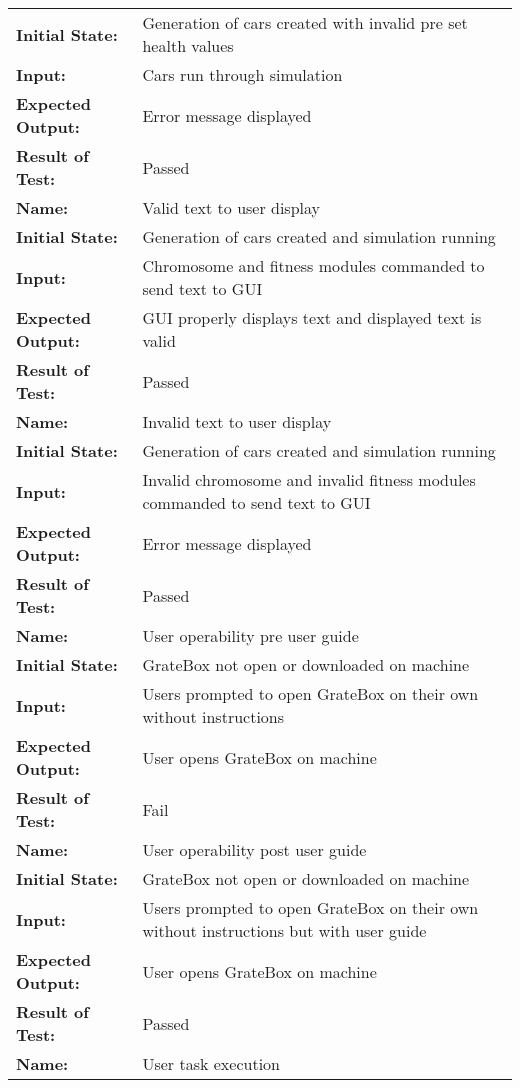 \documentclass[12pt, titlepage]{article}
\begin{document}
\begin{center}
\begin{longtable}{ l | p{10cm} }
\textbf{Initial State:} & Generation of cars created with invalid pre set health 
values\\
\textbf{Input:} & Cars run through simulation\\
\textbf{Expected Output:} & Error message displayed\\[0.6em]
\textbf{Result of Test:} & Passed\\
\hline
\rule{0pt}{1.5em}\textbf{Name:} & Valid text to user display\\
\textbf{Initial State:} & Generation of cars created and simulation running\\
\textbf{Input:} & Chromosome and fitness modules commanded to send text to GUI\\
\textbf{Expected Output:} & GUI properly displays text and displayed text is 
valid\\[0.6em]
\textbf{Result of Test:} & Passed\\
\hline
\rule{0pt}{1.5em}\textbf{Name:} & Invalid text to user display\\
\textbf{Initial State:} & Generation of cars created and simulation running\\
\textbf{Input:} & Invalid chromosome and invalid fitness modules commanded to 
send text to GUI\\
\textbf{Expected Output:} & Error message displayed\\[0.6em]
\textbf{Result of Test:} & Passed\\
\hline
\rule{0pt}{1.5em}\textbf{Name:} & User operability pre user guide\\
\textbf{Initial State:} & GrateBox not open or downloaded on machine\\
\textbf{Input:} & Users prompted to open GrateBox on their own without 
instructions\\
\textbf{Expected Output:} & User opens GrateBox on machine\\[0.6em]
\textbf{Result of Test:} & Fail\\
\hline
\rule{0pt}{1.5em}\textbf{Name:} & User operability post user guide\\
\textbf{Initial State:} & GrateBox not open or downloaded on machine\\
\textbf{Input:} & Users prompted to open GrateBox on their own without 
instructions but with user guide\\
\textbf{Expected Output:} & User opens GrateBox on machine\\[0.6em]
\textbf{Result of Test:} & Passed\\
\hline
\rule{0pt}{1.5em}\textbf{Name:} & User task execution\\

\end{longtable}
\end{center}
\end{document}
